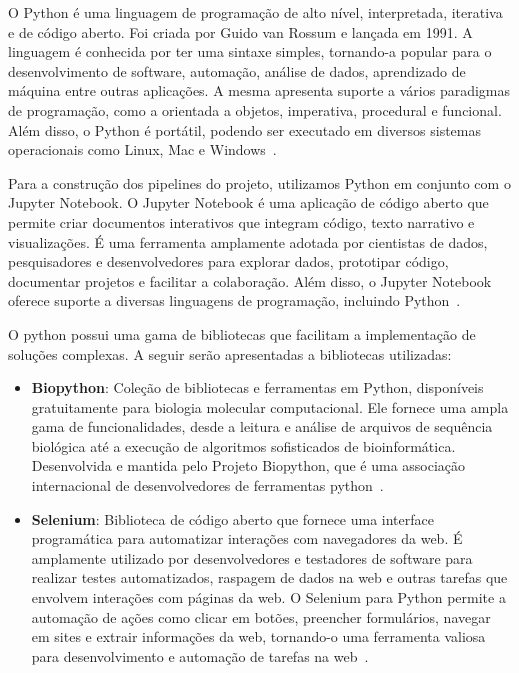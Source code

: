 O Python é uma linguagem de programação de alto nível, interpretada, iterativa e de código aberto. Foi criada por Guido van Rossum e lançada em 1991. A linguagem é conhecida por ter uma sintaxe simples, tornando-a popular para o desenvolvimento de software, automação, análise de dados, aprendizado de máquina entre outras aplicações. A mesma apresenta suporte a vários paradigmas de programação, como a orientada a objetos, imperativa, procedural e funcional. Além disso, o Python é portátil, podendo ser executado em diversos sistemas operacionais como Linux, Mac e Windows~\cite{python-reference}.

Para a construção dos pipelines do projeto, utilizamos Python em conjunto com o Jupyter Notebook. O Jupyter Notebook é uma aplicação de código aberto que permite criar documentos interativos que integram código, texto narrativo e visualizações. É uma ferramenta amplamente adotada por cientistas de dados, pesquisadores e desenvolvedores para explorar dados, prototipar código, documentar projetos e facilitar a colaboração. Além disso, o Jupyter Notebook oferece suporte a diversas linguagens de programação, incluindo Python~\cite{jupyter-notebook}.

O python possui uma gama de bibliotecas que facilitam a implementação de soluções complexas. A seguir serão apresentadas a bibliotecas utilizadas:

\begin{itemize}
  \item \textbf{Biopython}: Coleção de bibliotecas e ferramentas em Python, disponíveis gratuitamente para biologia molecular computacional. Ele fornece uma ampla gama de funcionalidades, desde a leitura e análise de arquivos de sequência biológica até a execução de algoritmos sofisticados de bioinformática. Desenvolvida e mantida pelo Projeto Biopython, que é uma associação internacional de desenvolvedores de ferramentas python~\cite{biopython}.
  \item \textbf{Selenium}: Biblioteca de código aberto que fornece uma interface programática para automatizar interações com navegadores da web. É amplamente utilizado por desenvolvedores e testadores de software para realizar testes automatizados, raspagem de dados na web e outras tarefas que envolvem interações com páginas da web. O Selenium para Python permite a automação de ações como clicar em botões, preencher formulários, navegar em sites e extrair informações da web, tornando-o uma ferramenta valiosa para desenvolvimento e automação de tarefas na web~\cite{selenium-python}.
\end{itemize}

